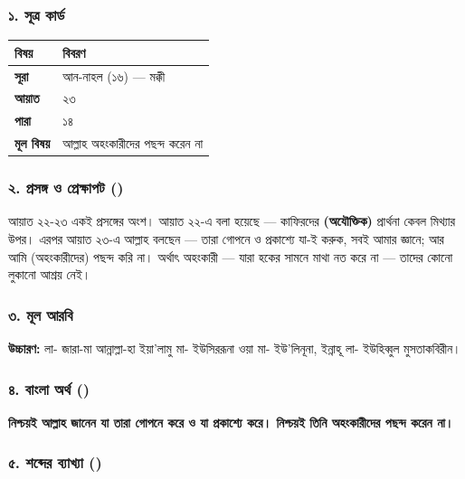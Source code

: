 \subsubsection*{১. সূত্র কার্ড}

\begin{table}[h]\centering\small
\begin{tabular}{ll}
বিষয় & বিবরণ \\
\hline
\textbf{সূরা} & আন-নাহল (১৬) — মক্কী \\
\textbf{আয়াত} & ২৩ \\
\textbf{পারা} & ১৪ \\
\textbf{মূল বিষয়} & আল্লাহ অহংকারীদের পছন্দ করেন না \\
\hline
\end{tabular}
\end{table}

\subsubsection*{২. প্রসঙ্গ ও প্রেক্ষাপট ()}

আয়াত ২২-২৩ একই প্রসঙ্গের অংশ। আয়াত ২২-এ বলা হয়েছে — কাফিরদের \textbf{ (অযৌক্তিক)} প্রার্থনা কেবল মিথ্যার উপর। এরপর আয়াত ২৩-এ আল্লাহ বলছেন — তারা গোপনে ও প্রকাশ্যে যা-ই করুক, সবই আমার জ্ঞানে; আর আমি  (অহংকারীদের) পছন্দ করি না। অর্থাৎ অহংকারী — যারা হকের সামনে মাথা নত করে না — তাদের কোনো লুকানো আশ্রয় নেই।

\subsubsection*{৩. মূল আরবি}
\begin{center}\end{center}
\textbf{উচ্চারণ:} লা- জারা-মা আন্নাল্লা-হা ইয়া'লামু মা- ইউসিররূনা ওয়া মা- ইউ'লিনূনা, ইন্নাহূ লা- ইউহিব্বুল মুসতাকবিরীন।

\subsubsection*{৪. বাংলা অর্থ ()}
\textbf{নিশ্চয়ই আল্লাহ জানেন যা তারা গোপনে করে ও যা প্রকাশ্যে করে। নিশ্চয়ই তিনি অহংকারীদের পছন্দ করেন না।}

\subsubsection*{৫. শব্দের ব্যাখ্যা ()}

